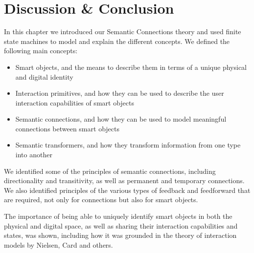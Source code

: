 \section{Discussion \& Conclusion}

In this chapter we introduced our Semantic Connections theory and used finite state machines to model and explain the different concepts. We defined the following main concepts: 

\begin{itemize}
	\item Smart objects, and the means to describe them in terms of a unique physical and digital identity
	\item Interaction primitives, and how they can be used to describe the user interaction capabilities of smart objects
	\item Semantic connections, and how they can be used to model meaningful connections between smart objects
	\item Semantic transformers, and how they transform information from one type into another
\end{itemize}   %

We identified some of the principles of semantic connections, including directionality and transitivity, as well as permanent and temporary connections. We also identified principles of the various types of feedback and feedforward that are required, not only for connections but also for smart objects.

The importance of being able to uniquely identify smart objects in both the physical and digital space, as well as sharing their interaction capabilities and states, was shown, including how it was grounded in the theory of interaction models by Nielsen, Card and others.


